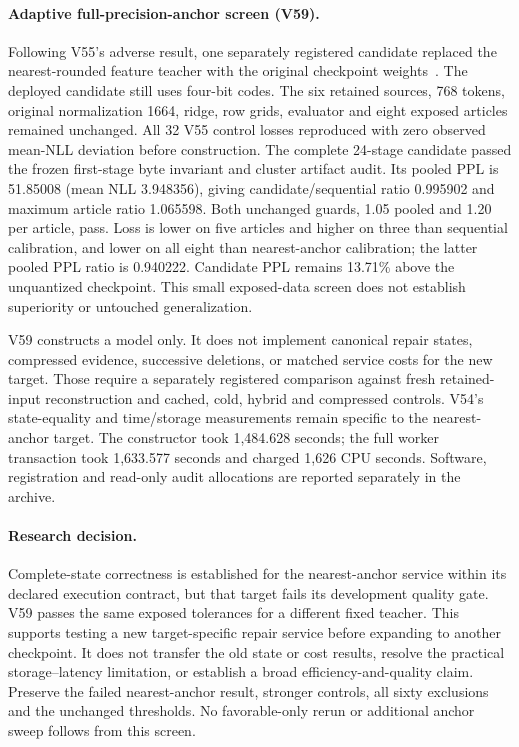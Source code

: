 \documentclass[10pt,twocolumn,letterpaper]{article}
\begin{document}
\paragraph{Adaptive full-precision-anchor screen (V59).}
Following V55's adverse result, one separately registered candidate replaced the
nearest-rounded feature teacher with the original checkpoint weights~\cite{v59terminal}.
The deployed candidate still uses four-bit codes. The six retained sources,
768 tokens, original normalization 1664, ridge, row grids, evaluator and eight
exposed articles remained unchanged. All 32 V55 control losses reproduced with
zero observed mean-NLL deviation before construction. The complete 24-stage
candidate passed the frozen first-stage byte invariant and cluster artifact audit.
Its pooled PPL is 51.85008 (mean NLL 3.948356), giving candidate/sequential ratio
0.995902 and maximum article ratio 1.065598. Both unchanged guards, 1.05 pooled
and 1.20 per article, pass. Loss is lower on five articles and higher on three
than sequential calibration, and lower on all eight than nearest-anchor
calibration; the latter pooled PPL ratio is 0.940222. Candidate PPL remains
13.71\% above the unquantized checkpoint. This small exposed-data screen does
not establish superiority or untouched generalization.

V59 constructs a model only. It does not implement canonical repair states,
compressed evidence, successive deletions, or matched service costs for the new
target. Those require a separately registered comparison against fresh retained-input
reconstruction and cached, cold, hybrid and compressed controls. V54's state-equality
and time/storage measurements remain specific to the nearest-anchor target.
The constructor took 1,484.628 seconds; the full worker transaction took
1,633.577 seconds and charged 1,626 CPU seconds. Software, registration and
read-only audit allocations are reported separately in the archive.

\paragraph{Research decision.}
Complete-state correctness is established for the nearest-anchor service within
its declared execution contract, but that target fails its development quality
gate. V59 passes the same exposed tolerances for a different fixed teacher.
This supports testing a new target-specific repair service before expanding to
another checkpoint. It does not transfer the old state or cost results, resolve
the practical storage--latency limitation, or establish a broad efficiency-and-quality
claim. Preserve the failed nearest-anchor result, stronger controls, all sixty
exclusions and the unchanged thresholds. No favorable-only rerun or additional
anchor sweep follows from this screen.
\end{document}
